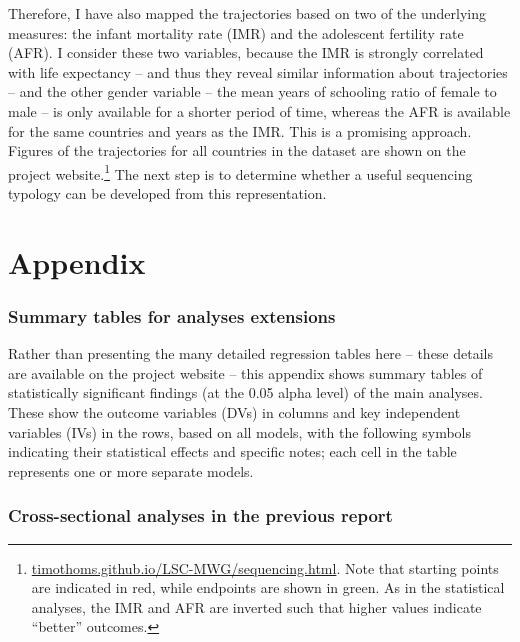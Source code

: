 \documentclass[12pt]{article}
\begin{document}
Therefore, I have also mapped the trajectories based on two of the underlying measures: the infant mortality rate (IMR) and the adolescent fertility rate (AFR). I consider these two variables, because the IMR is strongly correlated with life expectancy -- and thus they reveal similar information about trajectories -- and the other gender variable -- the mean years of schooling ratio of female to male -- is only available for a shorter period of time, whereas the AFR is available for the same countries and years as the IMR. This is a promising approach.
Figures of the trajectories for all countries in the dataset are shown on the project website.\footnote{\href{https://timothoms.github.io/LSC-MWG/sequencing.html}{timothoms.github.io/LSC-MWG/sequencing.html}. Note that starting points are indicated in red, while endpoints are shown in green. As in the statistical analyses, the IMR and AFR are inverted such that higher values indicate \enquote{better} outcomes.}
The next step is to determine whether a useful sequencing typology can be developed from this representation.

\clearpage
\appendix
\part*{Appendix}
\label{appendix}

\section{Summary tables for analyses extensions}
\label{appendix_tables}

Rather than presenting the many detailed regression tables here -- these details are available on the project website -- this appendix shows summary tables of statistically significant findings (at the 0.05 alpha level) of the main analyses. These show the outcome variables (DVs) in columns and key independent variables (IVs) in the rows, based on all models, with the following symbols indicating their statistical effects and specific notes; each cell in the table represents one or more separate models.








\section{Cross-sectional analyses in the previous report}
\label{appendix_cs_dane}
\end{document}
